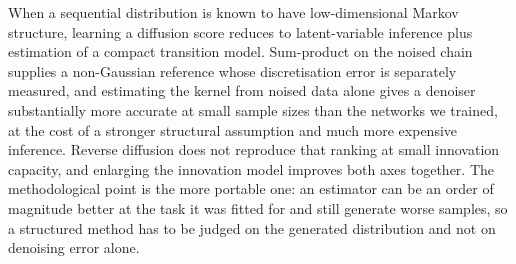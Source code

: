 \documentclass{article}
\begin{document}
When a sequential distribution is known to have low-dimensional Markov structure, learning a
diffusion score reduces to latent-variable inference plus estimation of a compact transition
model. Sum-product on the noised chain supplies a non-Gaussian reference whose discretisation
error is separately measured, and estimating the kernel from noised data alone gives a denoiser
substantially more accurate at small sample sizes than the networks we trained, at the cost of a
stronger structural assumption and much more expensive inference. Reverse diffusion does not
reproduce that ranking at small innovation capacity, and enlarging the innovation model improves
both axes together. The methodological point is the more portable one: an estimator can be an
order of magnitude better at the task it was fitted for and still generate worse samples, so a
structured method has to be judged on the generated distribution and not on denoising error
alone.




\clearpage
\appendix

\end{document}
